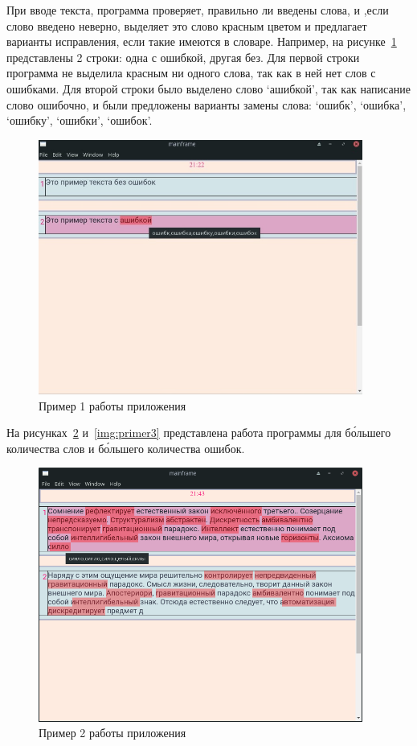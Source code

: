 При вводе текста, программа проверяет, правильно ли введены слова, и ,если слово введено неверно, выделяет это слово красным цветом и предлагает варианты исправления, если такие имеются в словаре. Например, на рисунке~\ref{img:primer1} представлены 2 строки: одна с ошибкой, другая без. Для первой строки программа не выделила красным ни одного слова, так как в ней нет слов с ошибками. Для второй строки было выделено слово `ашибкой', так как написание слово ошибочно, и были предложены варианты замены слова: `ошибк', `ошибка', `ошибку', `ошибки', `ошибок'.

\begin{figure}[H]
  \centering
  \includegraphics[width=0.95\textwidth]{TexModules/pics/primer1.jpg}
  \caption{Пример 1 работы приложения}
  \label{img:primer1}
\end{figure}

На рисунках~\ref{img:primer2} и~\ref{img:primer3} представлена работа программы для б\'{о}льшего количества слов и б\'{о}льшего количества ошибок.

\begin{figure}[H]
  \centering
  \includegraphics[width=0.95\textwidth]{TexModules/pics/primer2.jpg}
  \caption{Пример 2 работы приложения}
  \label{img:primer2}
\end{figure}


